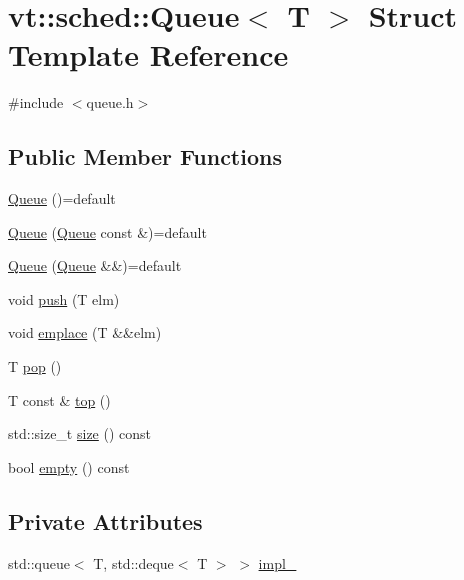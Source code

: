 \hypertarget{structvt_1_1sched_1_1_queue}{}\section{vt\+:\+:sched\+:\+:Queue$<$ T $>$ Struct Template Reference}
\label{structvt_1_1sched_1_1_queue}


{\ttfamily \#include $<$queue.\+h$>$}

\subsection*{Public Member Functions}
\begin{DoxyCompactItemize}
\item 
\hyperlink{structvt_1_1sched_1_1_queue_a5bca57d5a8c3bb7bfb30ed1bc634c29f}{Queue} ()=default
\item 
\hyperlink{structvt_1_1sched_1_1_queue_a718cecfdd0b3fa8ec80fe4768e153467}{Queue} (\hyperlink{structvt_1_1sched_1_1_queue}{Queue} const \&)=default
\item 
\hyperlink{structvt_1_1sched_1_1_queue_a0a85a456ebc179a2f7ab77369566eb5c}{Queue} (\hyperlink{structvt_1_1sched_1_1_queue}{Queue} \&\&)=default
\item 
void \hyperlink{structvt_1_1sched_1_1_queue_a5079f0b8b665ec528767a12ab210d1be}{push} (T elm)
\item 
void \hyperlink{structvt_1_1sched_1_1_queue_a5b99b53786540fdff718540010fecb1b}{emplace} (T \&\&elm)
\item 
T \hyperlink{structvt_1_1sched_1_1_queue_ad5e435489eb04cd78a2da6acfa855331}{pop} ()
\item 
T const  \& \hyperlink{structvt_1_1sched_1_1_queue_a636c676d2dc99d283ba3607e7ed5b390}{top} ()
\item 
std\+::size\+\_\+t \hyperlink{structvt_1_1sched_1_1_queue_a0d5cd0a31703541be21f3bbd1590464e}{size} () const
\item 
bool \hyperlink{structvt_1_1sched_1_1_queue_a499b45b0a8c55731b09885dbd28882a8}{empty} () const
\end{DoxyCompactItemize}
\subsection*{Private Attributes}
\begin{DoxyCompactItemize}
\item 
std\+::queue$<$ T, std\+::deque$<$ T $>$ $>$ \hyperlink{structvt_1_1sched_1_1_queue_a68cbe05570c230c55b730d8e98a1f6a5}{impl\+\_\+}
\end{DoxyCompactItemize}


